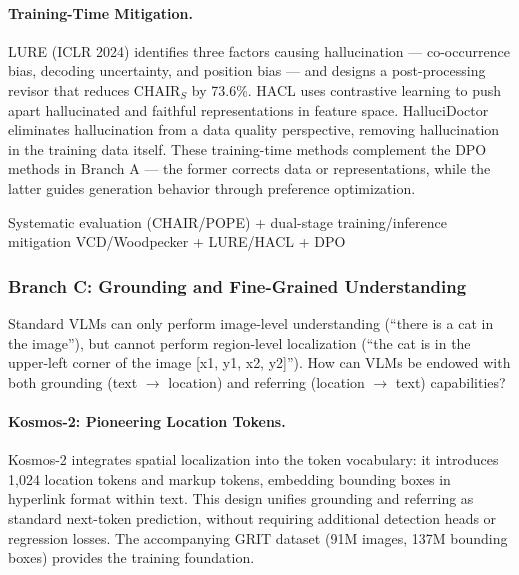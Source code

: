 \paragraph{Training-Time Mitigation.}
LURE \cite{zhou2023lure} (ICLR 2024) identifies three factors causing hallucination ---
co-occurrence bias, decoding uncertainty, and position bias ---
and designs a post-processing revisor that reduces CHAIR$_S$ by 73.6\%.
HACL \cite{jiang2023hacl} uses contrastive learning
to push apart hallucinated and faithful representations in feature space.
HalluciDoctor \cite{yu2023hallucidoctor} eliminates hallucination from a data quality perspective, removing hallucination in the training data itself.
These training-time methods complement the DPO methods in Branch A ---
the former corrects data or representations, while the latter guides generation behavior through preference optimization.

  {Systematic evaluation (CHAIR/POPE) + dual-stage training/inference mitigation}
  {VCD/Woodpecker + LURE/HACL + DPO}

\subsubsection{Branch C: Grounding and Fine-Grained Understanding}
\label{sec:t5-branch-c}

\begin{problembox}
Standard VLMs can only perform image-level understanding (``there is a cat in the image''),
but cannot perform region-level localization (``the cat is in the upper-left corner of the image [x1, y1, x2, y2]'').
How can VLMs be endowed with both grounding (text $\rightarrow$ location)
and referring (location $\rightarrow$ text) capabilities?
\end{problembox}

\paragraph{Kosmos-2: Pioneering Location Tokens.}
Kosmos-2 \cite{peng2023kosmos2} integrates spatial localization into the token vocabulary:
it introduces 1,024 location tokens and markup tokens,
embedding bounding boxes in hyperlink format within text.
This design unifies grounding and referring as standard next-token prediction,
without requiring additional detection heads or regression losses.
The accompanying GRIT dataset (91M images, 137M bounding boxes) provides the training foundation.

